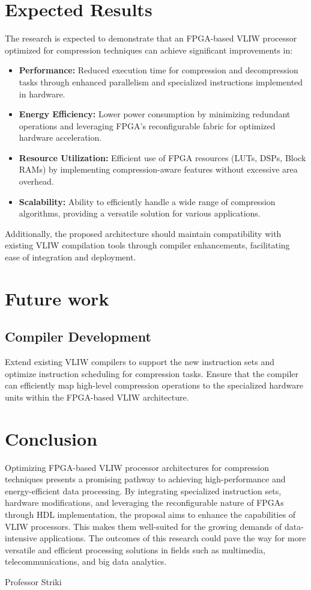 \documentclass[sigconf]{acmart}
\begin{document}
	\section{Expected Results}
	The research is expected to demonstrate that an FPGA-based VLIW processor optimized for compression techniques can achieve significant improvements in:
	
	\begin{itemize}
		\item \textbf{Performance:} Reduced execution time for compression and decompression tasks through enhanced parallelism and specialized instructions implemented in hardware.
		\item \textbf{Energy Efficiency:} Lower power consumption by minimizing redundant operations and leveraging FPGA's reconfigurable fabric for optimized hardware acceleration.
		\item \textbf{Resource Utilization:} Efficient use of FPGA resources (LUTs, DSPs, Block RAMs) by implementing compression-aware features without excessive area overhead.
		\item \textbf{Scalability:} Ability to efficiently handle a wide range of compression algorithms, providing a versatile solution for various applications.
	\end{itemize}
	
	Additionally, the proposed architecture should maintain compatibility with existing VLIW compilation tools through compiler enhancements, facilitating ease of integration and deployment.
	
	\section{Future work}
	\subsection{Compiler Development}
	Extend existing VLIW compilers to support the new instruction sets and optimize instruction scheduling for compression tasks. Ensure that the compiler can efficiently map high-level compression operations to the specialized hardware units within the FPGA-based VLIW architecture.
	
	\section{Conclusion}
	Optimizing FPGA-based VLIW processor architectures for compression techniques presents a promising pathway to achieving high-performance and energy-efficient data processing. By integrating specialized instruction sets, hardware modifications, and leveraging the reconfigurable nature of FPGAs through HDL implementation, the proposal aims to enhance the capabilities of VLIW processors. This makes them well-suited for the growing demands of data-intensive applications. The outcomes of this research could pave the way for more versatile and efficient processing solutions in fields such as multimedia, telecommunications, and big data analytics.
	
	\begin{acks}
		Professor Striki
	\end{acks}
	
	
	
	
\end{document}
